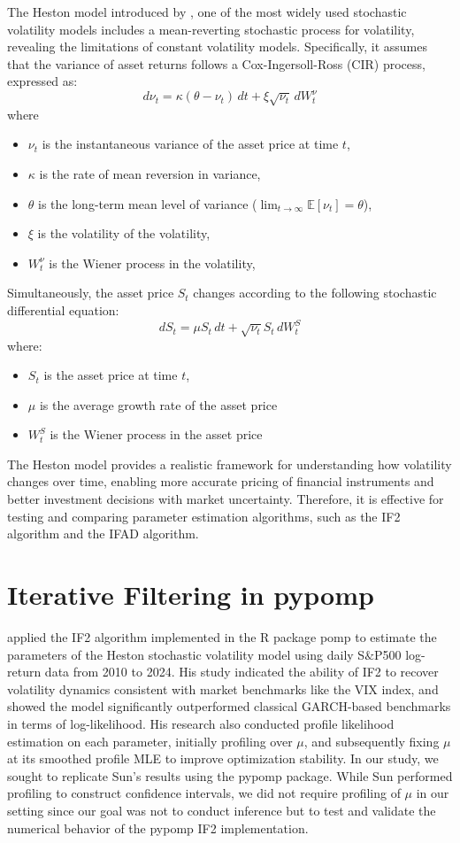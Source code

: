 \documentclass[11pt]{report}
\begin{document}
The Heston model introduced by \textbf{\citet{heston1993closed}}, one of the most widely used stochastic volatility models includes a mean-reverting stochastic process for volatility, revealing the limitations of constant volatility models. Specifically, it assumes that the variance of asset returns follows a Cox-Ingersoll-Ross (CIR) process, expressed as:
\[d\nu_t = \kappa(\theta - \nu_t) \, dt + \xi \sqrt{\nu_t} \,dW_t^\nu\]
where 
\begin{itemize}
    \item $\nu_t$ is the instantaneous variance of the asset price at time $t$,
    \item $\kappa$ is the rate of mean reversion in variance, 
    \item $\theta$ is the long-term mean level of variance ($\lim_{t \to \infty} \mathbb{E}[\nu_t] = \theta$),
    \item $\xi$ is the volatility of the volatility,
    \item $W_t^\nu$ is the Wiener process in the volatility,
\end{itemize}
Simultaneously, the asset price $S_t$ changes according to the following stochastic differential equation:
 \[dS_t = \mu S_t\, dt + \sqrt{\nu_t} S_t \, dW_t^S\] 
 where:
\begin{itemize}
\item $S_t$ is the asset price at time $t$,
\item $\mu$ is the average growth rate of the asset price 
\item $W_t^S$ is the Wiener process in the asset price
\end{itemize}
 
The Heston model provides a realistic framework for understanding how volatility changes over time, enabling more accurate pricing of financial instruments and better investment decisions with market uncertainty. Therefore, it is effective for testing and comparing parameter estimation algorithms, such as the IF2 algorithm and the IFAD algorithm.
\newpage



\chapter{Iterative Filtering in pypomp}\label{chap:organizing}
\textbf{\citet{sunmodel}} applied the IF2 algorithm implemented in the R package pomp to estimate the parameters of the Heston stochastic volatility model using daily S$\&$P500 log-return data from 2010 to 2024. His study indicated the ability of IF2 to recover volatility dynamics consistent with market benchmarks like the VIX index, and showed the model significantly outperformed classical GARCH-based benchmarks in terms of log-likelihood. His research also conducted profile likelihood estimation on each parameter, initially profiling over $\mu$, and subsequently fixing $\mu$ at its smoothed profile MLE to improve optimization stability. In our study, we sought to replicate Sun’s results using the pypomp package. While Sun performed profiling to construct confidence intervals, we did not require profiling of $\mu$ in our setting since our goal was not to conduct inference but to test and validate the numerical behavior of the pypomp IF2 implementation. 
\end{document}
